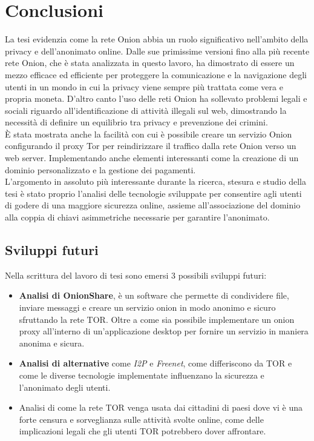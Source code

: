 \chapter{Conclusioni}

La tesi evidenzia come la rete Onion abbia un ruolo significativo nell'ambito della privacy e dell'anonimato online. 
Dalle sue primissime versioni fino alla più recente rete Onion, che è stata analizzata in questo lavoro, ha dimostrato di essere un mezzo efficace ed efficiente per proteggere la comunicazione e la navigazione degli utenti in un mondo in cui la privacy viene sempre più trattata come vera e propria moneta.
D'altro canto l'uso delle reti Onion ha sollevato problemi legali e sociali riguardo all'identificazione di attività illegali sul web, dimostrando la necessità di definire un equilibrio tra privacy e prevenzione dei crimini.
\\

È stata mostrata anche la facilità con cui è possibile creare un servizio Onion configurando il proxy Tor per reindirizzare il traffico dalla rete Onion verso un web server. 
Implementando anche elementi interessanti come la creazione di un dominio personalizzato e la gestione dei pagamenti.
\\

L'argomento in assoluto più interessante durante la ricerca, stesura e studio della tesi è stato proprio l'analisi delle tecnologie sviluppate per consentire agli utenti di godere di una maggiore sicurezza online, assieme all'associazione del dominio alla coppia di chiavi asimmetriche necessarie per garantire l'anonimato. 

\section{Sviluppi futuri}
Nella scrittura del lavoro di tesi sono emersi 3 possibili sviluppi futuri:
\begin{itemize}
    \item \textbf{Analisi di OnionShare}, è un software che permette di condividere file, inviare messaggi e creare un servizio onion in modo anonimo e sicuro sfruttando la rete TOR. Oltre a come sia possibile implementare un onion proxy all'interno di un'applicazione desktop per fornire un servizio in maniera anonima e sicura.
    \item \textbf{Analisi di alternative} come \emph{I2P} e \emph{Freenet}, come differiscono da TOR e come le diverse tecnologie implementate influenzano la sicurezza e l'anonimato degli utenti.
    \item Analisi di come la rete TOR venga usata dai cittadini di paesi dove vi è una forte censura e sorveglianza sulle attività svolte online, come delle implicazioni legali che gli utenti TOR potrebbero dover affrontare. 
\end{itemize}
